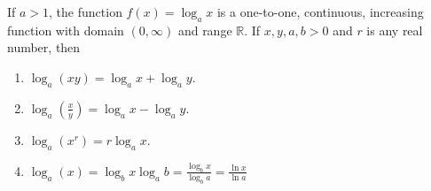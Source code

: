 \begin{frame}
\begin{theorem}
If $a > 1$, the function $f(x) = \log_a x$ is a one-to-one, continuous, increasing function with domain $(0, \infty )$ and range $\mathbb{R}$.  If $x, y, a, b > 0$ and $r$ is any real number, then
\begin{enumerate}
\item  $\log_a (xy) = \log_a x + \log_a y$.
\item  $\log_a \left( \frac{x}{y}\right) = \log_a x - \log_a y$.
\item  $\log_a (x^r) = r\log_a x$.
\item  $\log_{a}(x)=\log_b x \log_{a} b=\frac{\log_b x}{\log_{b} a}=  \frac{\ln x}{\ln a}$
\end{enumerate}
\end{theorem}
\end{frame}
